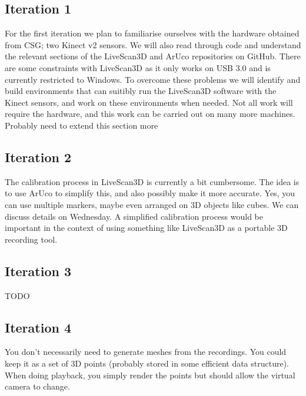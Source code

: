 \documentclass[a4paper,12pt]{article}
\begin{document}
\subsection*{Iteration 1}
For the first iteration we plan to familiarise ourselves with the hardware obtained from CSG; two Kinect v2 sensors. We will also read through code and understand the relevant sections of the LiveScan3D and ArUco repositories on GitHub. There are some constraints with LiveScan3D as it only works on USB 3.0 and is currently restricted to Windows. To overcome these problems we will identify and build environments that can suitibly run the LiveScan3D software with the Kinect sensors, and work on these environments when needed. Not all work will require the hardware, and this work can be carried out on many more machines.
\\
Probably need to extend this section more

\subsection*{Iteration 2}
The calibration process in LiveScan3D is currently a bit cumbersome. The idea is to use ArUco to simplify this, and also possibly make it more accurate. Yes, you can use multiple markers, maybe even arranged on 3D objects like cubes. We can discuss details on Wednesday. A simplified calibration process would be important in the context of using something like LiveScan3D as a portable 3D recording tool.

\subsection*{Iteration 3}
TODO

\subsection*{Iteration 4}
You don't necessarily need to generate meshes from the recordings. You could keep it as a set of 3D points (probably stored in some efficient data structure). When doing playback, you simply render the points but should allow the virtual camera to change.
\end{document}
